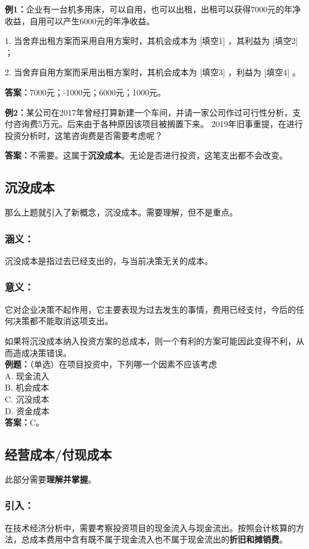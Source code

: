 \textbf{例1：}企业有一台机多用床，可以自用，也可以出租，出租可以获得7000元的年净收益，自用可以产生6000元的年净收益。

1. 当舍弃出租方案而采用自用方案时，其机会成本为 [填空1] ，其利益为 [填空2] ；

2. 当舍弃自用方案而采用出租方案时，其机会成本为 [填空3] ，利益为 [填空4] 。

\textbf{答案：}7000元；-1000元；6000元；1000元。

\textbf{例2：}某公司在2017年曾经打算新建一个车间，并请一家公司作过可行性分析，支付咨询费5万元。后来由于各种原因该项目被搁置下来。 2019年旧事重提，在进行投资分析时，这笔咨询费是否需要考虑呢？

\textbf{答案：}不需要。这属于\textbf{沉没成本}。无论是否进行投资，这笔支出都不会改变。

\subsection{沉没成本}
那么上题就引入了新概念，沉没成本。需要理解，但不是重点。
\subsubsection{涵义：}
沉没成本是指过去已经支出的，与当前决策无关的成本。
\subsubsection{意义：}
它对企业决策不起作用，它主要表现为过去发生的事情，费用已经支付，今后的任何决策都不能取消这项支出。

如果将沉没成本纳入投资方案的总成本，则一个有利的方案可能因此变得不利，从而造成决策错误。\\
\textbf{例题：}（单选）在项目投资中，下列哪一个因素不应该考虑\\
A. 现金流入\\
B. 机会成本\\
C. 沉没成本\\
D. 资金成本\\
\textbf{答案：}C。

\subsection{经营成本/付现成本}
此部分需要\textbf{理解并掌握}。

\subsubsection{引入：}
在技术经济分析中，需要考察投资项目的现金流入与现金流出。按照会计核算的方法，总成本费用中含有既不属于现金流入也不属于现金流出的\textbf{折旧和摊销费}。

